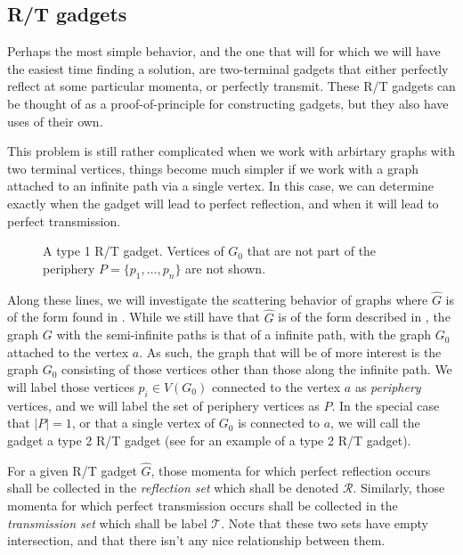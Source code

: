 \documentclass[../thesis-main/thesis-main]{subfiles}
\begin{document}

\subsection{R/T gadgets}
 
Perhaps the most simple behavior, and the one that will for which we will have the easiest time finding a solution, are two-terminal gadgets that either perfectly reflect at some particular momenta, or perfectly transmit.  These R/T gadgets can be thought of as a proof-of-principle for constructing gadgets, but they also have uses of their own.

This problem is still rather complicated when we work with arbirtary graphs with two terminal vertices, things become much simpler if we work with a graph attached to an infinite path via a single vertex.  In this case, we can determine exactly when the gadget will lead to perfect reflection, and when it will lead to perfect transmission.

\begin{figure}
  \centering
  
  \caption{A type 1 R/T gadget.  Vertices of $G_0$ that are not part of the periphery $P = \{p_1,\ldots,p_n\}$ are not shown.}
  \label{fig:reversal_orig}
\end{figure}

Along these lines, we will investigate the scattering behavior of graphs where $\widehat{G}$ is of the form found in .  While we still have that $\widehat{G}$ is of the form described in , the graph $G$ with the semi-infinite paths is that of a infinite path, with the graph $G_0$ attached to the vertex $a$.  As such, the graph that will be of more interest is the graph $G_0$ consisting of those vertices other than those along the infinite path.   We will label those vertices $p_i\in V(G_0)$ connected to the vertex $a$ as \emph{periphery} vertices, and we will label the set of periphery vertices as $P$.  In the special case that $|P| = 1$, or that a single vertex of $G_0$ is connected to $a$, we will call the gadget a type 2 R/T gadget (see  for an example of a type 2 R/T gadget).

For a given R/T gadget $\widehat{G}$, those momenta for which perfect reflection occurs shall be collected in the \emph{reflection set} which shall be denoted $\mathcal{R}$.  Similarly, those momenta for which perfect transmission occurs shall be collected in the \emph{transmission set} which shall be label $\mathcal{T}$. Note that these two sets have empty intersection, and that there isn't any nice relationship between them.
\end{document}
